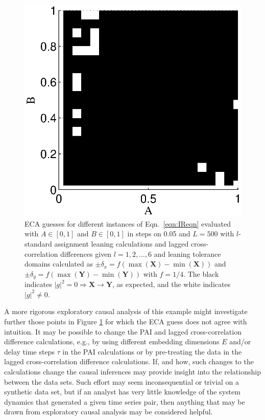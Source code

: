 \begin{figure}[ht]
\begin{center}
\includegraphics[scale=0.8]{NoisyResponseExample_ECAguessMat.eps} 
\end{center}
\caption{ECA guesses for different instances of Eqn.\ \ref{eqn:IReqn} evaluated with $A\in[0,1]$ and $B\in[0,1]$ in steps on 0.05 and $L=500$ with $l$-standard assignment leaning calculations and lagged cross-correlation differences given $l=1,2,\ldots,6$ and leaning tolerance domains calculated as $\pm\delta_x=f(\max(\mathbf{X})-\min(\mathbf{X}))$ and $\pm\delta_y=f(\max(\mathbf{Y})-\min(\mathbf{Y}))$ with $f=1/4$.  The black indicates $|g|^2=0\Rightarrow\mathbf{X}\rightarrow\mathbf{Y}$, as expected, and the white indicates $|g|^2 \neq 0$.}
\label{fig:IRxyECAguess}
\end{figure}

A more rigorous exploratory causal analysis of this example might investigate further those points in Figure \ref{fig:IRxyECAguess} for which the ECA guess does not agree with intuition.  It may be possible to change the PAI and lagged cross-correlation difference calculations, e.g., by using different embedding dimensions $E$ and/or delay time steps $\tau$ in the PAI calculations or by pre-treating the data in the lagged cross-correlation difference calculations.  If, and how, such changes to the calculations change the causal inferences may provide insight into the relationship between the data sets.  Such effort may seem inconsequential or trivial on a synthetic data set, but if an analyst has very little knowledge of the system dynamics that generated a given time series pair, then anything that may be drawn from exploratory causal analysis may be considered helpful.  

